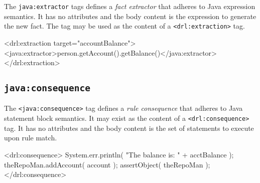 The \verb|java:extractor| tags defines a \emph{fact extractor}
that adheres to Java expression semantics.  It has
no attributes and the body content is the expression to generate
the new fact.  The tag may be used as the content of a 
\verb|<drl:extraction>| tag.

\begin{codelisting}
\textcolor{light}{<drl:extraction target="accountBalance">}
  <java:extractor>person.getAccount().getBalance()</java:extractor>
\textcolor{light}{</drl:extraction>}
\end{codelisting}

\subsection{\texttt{java:consequence}}

The \verb|<java:consequence>| tag defines a \emph{rule consequence}
that adheres to Java statement block semantics.  It may exist as the
content of a \verb|<drl:consequence>| tag.  It has no
attributes and the body content is the set of statements
to execute upon rule match.


\begin{codelisting}
\textcolor{light}{<drl:consequence>}
   System.err.println( "The balance is: " + acctBalance );
   theRepoMan.addAccount( account );
   assertObject( theRepoMan );
\textcolor{light}{</drl:consequence>}
\end{codelisting}


